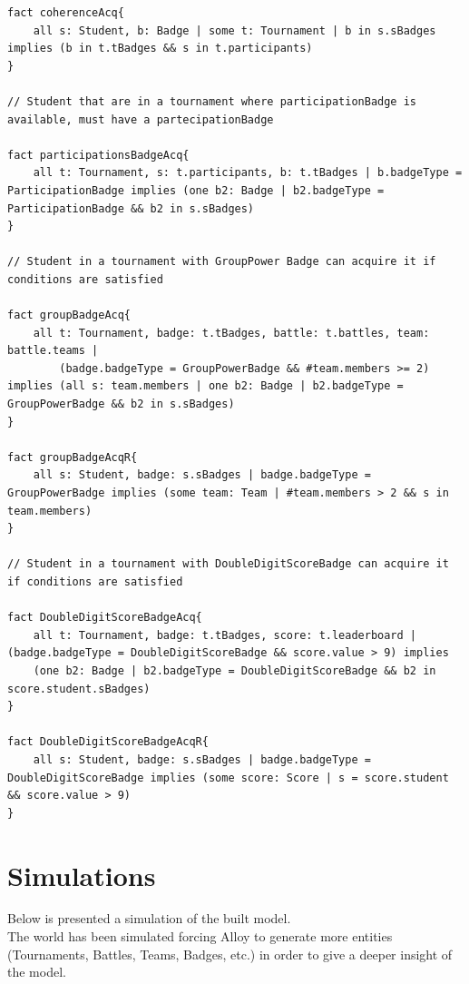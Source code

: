 \begin{lstlisting}[language=alloy,label={lst:alloy_code}]
fact coherenceAcq{
    all s: Student, b: Badge | some t: Tournament | b in s.sBadges implies (b in t.tBadges && s in t.participants)   
}

// Student that are in a tournament where participationBadge is available, must have a partecipationBadge

fact participationsBadgeAcq{
    all t: Tournament, s: t.participants, b: t.tBadges | b.badgeType = ParticipationBadge implies (one b2: Badge | b2.badgeType = ParticipationBadge && b2 in s.sBadges)
}

// Student in a tournament with GroupPower Badge can acquire it if conditions are satisfied

fact groupBadgeAcq{
    all t: Tournament, badge: t.tBadges, battle: t.battles, team: battle.teams |
        (badge.badgeType = GroupPowerBadge && #team.members >= 2) implies (all s: team.members | one b2: Badge | b2.badgeType = GroupPowerBadge && b2 in s.sBadges)
}

fact groupBadgeAcqR{
    all s: Student, badge: s.sBadges | badge.badgeType = GroupPowerBadge implies (some team: Team | #team.members > 2 && s in team.members)
}

// Student in a tournament with DoubleDigitScoreBadge can acquire it if conditions are satisfied

fact DoubleDigitScoreBadgeAcq{
    all t: Tournament, badge: t.tBadges, score: t.leaderboard | (badge.badgeType = DoubleDigitScoreBadge && score.value > 9) implies 
    (one b2: Badge | b2.badgeType = DoubleDigitScoreBadge && b2 in score.student.sBadges)
}

fact DoubleDigitScoreBadgeAcqR{
    all s: Student, badge: s.sBadges | badge.badgeType = DoubleDigitScoreBadge implies (some score: Score | s = score.student && score.value > 9)
}
\end{lstlisting}
\section{Simulations}
\label{sec: sim}%
Below is presented a simulation of the built model.\\
The world has been simulated forcing Alloy to generate more entities (Tournaments, Battles, Teams, Badges, etc.) in order to give a deeper insight of the model.

